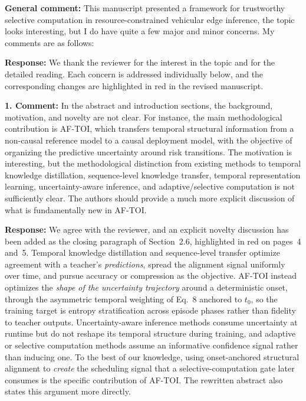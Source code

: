 \documentclass[1p,12pt,authoryear]{elsarticle}
\begin{document}
\vspace{2mm}
\noindent \textbf{General comment:} This manuscript presented a framework for trustworthy selective computation in resource-constrained vehicular edge inference, the topic looks interesting, but I do have quite a few major and minor concerns. My comments are as follows:

\vspace{2mm}
\noindent \textbf{Response:} We thank the reviewer for the interest in the topic and for the detailed reading. Each concern is addressed individually below, and the corresponding changes are highlighted in red in the revised manuscript.

\vspace{0.5cm}
\noindent \textbf{1. Comment:} In the abstract and introduction sections, the background, motivation, and novelty are not clear. For instance, the main methodological contribution is AF-TOI, which transfers temporal structural information from a non-causal reference model to a causal deployment model, with the objective of organizing the predictive uncertainty around risk transitions. The motivation is interesting, but the methodological distinction from existing methods to temporal knowledge distillation, sequence-level knowledge transfer, temporal representation learning, uncertainty-aware inference, and adaptive/selective computation is not sufficiently clear. The authors should provide a much more explicit discussion of what is fundamentally new in AF-TOI.

\vspace{2mm}
\noindent \textbf{Response:} We agree with the reviewer, and an explicit novelty discussion has been added as the closing paragraph of Section~2.6, highlighted in red on pages~4 and~5. Temporal knowledge distillation and sequence-level transfer optimize agreement with a teacher's \emph{predictions}, spread the alignment signal uniformly over time, and pursue accuracy or compression as the objective. AF-TOI instead optimizes the \emph{shape of the uncertainty trajectory} around a deterministic onset, through the asymmetric temporal weighting of Eq.~8 anchored to $t_0$, so the training target is entropy stratification across episode phases rather than fidelity to teacher outputs. Uncertainty-aware inference methods consume uncertainty at runtime but do not reshape its temporal structure during training, and adaptive or selective computation methods assume an informative confidence signal rather than inducing one. To the best of our knowledge, using onset-anchored structural alignment to \emph{create} the scheduling signal that a selective-computation gate later consumes is the specific contribution of AF-TOI. The rewritten abstract also states this argument more directly.
\end{document}
